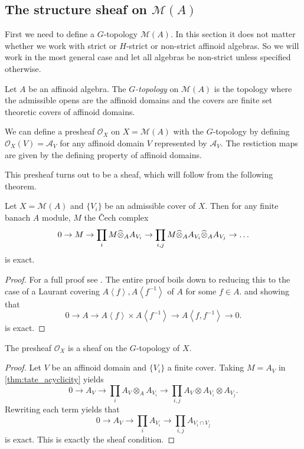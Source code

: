\subsection{The structure sheaf on $\mathcal{M} (A)$} \label{sec:the_structure_sheaf_on_ma}

First we need to define a $G$-topology $\mathcal{M} (A)$. 
In this section it does not matter whether we work with strict or $H$-strict or non-strict affinoid algebras. So we will work in the most general case and let all algebras be non-strict unless specified otherwise.  

\begin{definition}
	Let $A$ be an affinoid algebra. 
	The \emph{$G$-topology} on $\mathcal{M} (A)$ is the topology where the admissible opens are the affinoid domains and the covers are finite set theoretic covers of affinoid domains. 
\end{definition}

We can define a presheaf $\mathcal{O}_X$ on $X =\mathcal{M} (A)$ with the $G$-topology by defining $\mathcal{O}_X(V) = \mathcal{A} _V$ for any affinoid domain $V$ represented by $\mathcal{A}_V$.
The restiction maps are given by the defining property of affinoid domains.

This presheaf turns out to be a sheaf, which will follow from the following theorem. 
\begin{theorem}\label{thm:tate_acyclicity}
	Let $X = \mathcal{M} (A)$ and $\{V_i\} $ be an admissible cover of $X$. 
	Then for any finite banach $A$ module, $M$ the Čech complex \[
		0 \to M \to \prod_{i} M \widehat{\otimes}_A A_{V_i} \to \prod_{i, j} M \widehat{\otimes}_A A_{V_i} \widehat{\otimes}_A A_{V_j} \to \ldots
	\] 
	is exact. 
\end{theorem}
\begin{proof}
	For a full proof see \cite[][prop.\ 2.2.5]{berkovichSpectralTheoryAnalytic2012}. 
	The entire proof boils down to reducing this to the case of a Laurant covering $A\left<f \right>, A\left<f^{-1} \right>$ of $A$ for some $f \in A$. and showing that \[
		0 \to A \to A\left<f \right>\times  A\left<f^{-1} \right> \to A\left<f, f^{-1} \right> \to 0
	.\]  
	is exact. 
\end{proof}


\begin{corollary}
	The presheaf $\mathcal{O}_X$ is a sheaf on the $G$-topology of $X$.
\end{corollary}
\begin{proof}
	Let $V$ be an affinoid domain and $\{V_i\} $ a finite cover. 
	Taking $M = A_V$ in \cref{thm:tate_acyclicity} yields \[
	0 \to A_V \to \prod_{i } A_V \otimes_A A_{V_i} \to \prod_{i,j} A_V \otimes A_{V_i} \otimes A_{V_j}
	.\] 
	Rewriting each term yields that \[
	0 \to A_V \to \prod_i A_{V_i} \to \prod_{i, j} A_{V_i \cap V_j}
	\] 
	is exact. This is exactly the sheaf condition. 
\end{proof}

